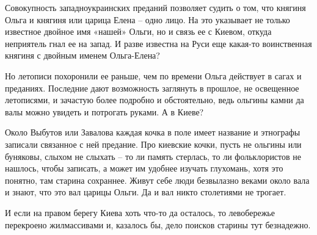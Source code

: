 Совокупность западноукраинских преданий позволяет судить о том, что княгиня Ольга и княгиня или царица Елена – одно лицо. На это указывает не только известное двойное имя «нашей» Ольги, но и связь ее с Киевом, откуда неприятель гнал ее на запад. И разве известна на Руси еще какая-то воинственная княгиня с двойным именем Ольга-Елена? 

Но летописи похоронили ее раньше, чем по времени Ольга действует в сагах и преданиях. Последние дают возможность заглянуть в прошлое, не освещенное летописями, и зачастую более подробно и обстоятельно, ведь ольгины камни да валы можно увидеть и потрогать руками. А в Киеве?

Около Выбутов или Завалова каждая кочка в поле имеет название и этнографы записали связанное с ней предание. Про киевские кочки, пусть не ольгины или буняковы, слыхом не слыхать – то ли память стерлась, то ли фольклористов не нашлось, чтобы записать, а может им удобнее изучать глухомань, хотя это понятно, там старина сохраннее. Живут себе люди безвылазно веками около вала и знают, что это вал царицы Ольги. Да и вал никто столетиями не трогает. 

И если на правом берегу Киева хоть что-то да осталось, то левобережье перекроено жилмассивами и, казалось бы, дело поисков старины тут безнадежно.

